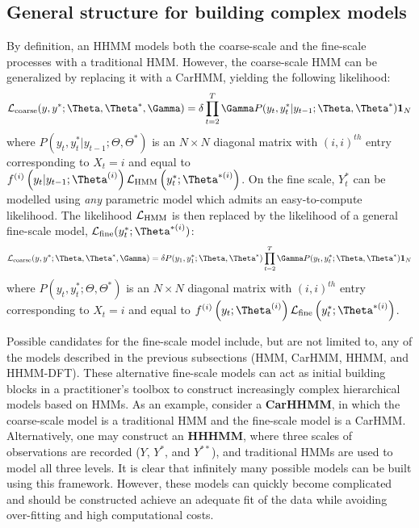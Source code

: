
\subsection{General structure for building complex models}

By definition, an HHMM models both the coarse-scale and the fine-scale processes with a traditional HMM. However, the coarse-scale HMM can be generalized by replacing it with a CarHMM, yielding the following likelihood:
\[
\calL_{\text{coarse}}(y,y^*;\Theta,\Theta^*,\Gamma) = \delta \prod_{t=2}^T \Gamma P(y_t,y^*_t|y_{t-1};\Theta,\Theta^*) \mathbf{1}_N
\]
where $P(y_t,y^*_t|y_{t-1};\Theta,\Theta^*) $ is an $N \times N$ diagonal matrix with $(i,i)^{th}$ entry corresponding to $X_t=i$ and equal to $f^{(i)}\left(y_t|y_{t-1};\Theta^{(i)}\right)\calL_{\text{HMM}}\left(y^*_t;\Theta^{*(i)}\right)$. 
On the fine scale, $Y^*_t$ can be modelled using \textit{any} parametric model which admits an easy-to-compute likelihood. The likelihood $\mathcal{L}_{\text{HMM}}$ is then replaced by the likelihood of a general fine-scale model, $\calL_{\text{fine}}(y^*_t;\Theta^{*(i)})$:
\[
\calL_{\text{coarse}}(y,y^*;\Theta,\Theta^*,\Gamma) = \delta P(y_1,y^*_1;\Theta,\Theta^*) \prod_{t=2}^T \Gamma P(y_t,y^*_t;\Theta,\Theta^*) \mathbf{1}_N
\]
where $P(y_t,y^*_t;\Theta,\Theta^*) $ is an $N \times N$ diagonal matrix with $(i,i)^{th}$ entry corresponding to $X_t=i$ and equal to $f^{(i)}\left(y_t;\Theta^{(i)}\right)\calL_{\text{fine}}\left(y^*_t;\Theta^{*(i)}\right)$. 

Possible candidates for the fine-scale model include, but are not limited to, any of the models described in the previous subsections (HMM, CarHMM, HHMM, and HHMM-DFT). These alternative fine-scale models can act as initial building blocks in a practitioner's toolbox to construct increasingly complex hierarchical models based on HMMs. As an example, consider a \textbf{CarHHMM}, in which the coarse-scale model is a traditional HMM and the fine-scale model is a CarHMM. Alternatively, one may construct an \textbf{HHHMM}, where three scales of observations are recorded ($Y$, $Y^*$, and $Y^{**}$), and traditional HMMs are used to model all three levels. It is clear that infinitely many possible models can be built using this framework. However, these models can quickly become complicated and should be constructed achieve an adequate fit of the data while avoiding over-fitting and high computational costs.
